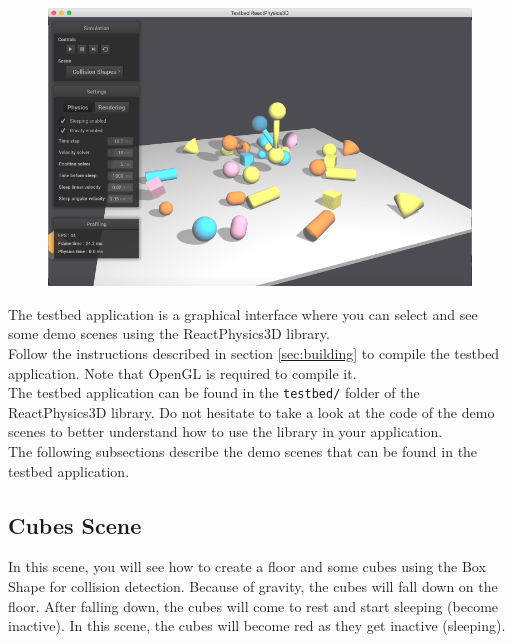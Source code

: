 \documentclass[a4paper,12pt]{article}
\begin{document}
    \begin{figure}[h]
        \centering
        \includegraphics{testbed.png}
        \label{fig:testbed}
    \end{figure}

    The testbed application is a graphical interface where you can select and see some demo scenes using the
    ReactPhysics3D library. \\

    Follow the instructions described in section \ref{sec:building} to
    compile the testbed application. Note that OpenGL is required to compile it. \\

    The testbed application can be found in the \texttt{testbed/} folder of
    the ReactPhysics3D library. Do not hesitate to take a look at the code of the demo scenes to better understand how
    to use the library in your application. \\

    The following subsections describe the demo scenes that can be found in the testbed application.

    \subsection{Cubes Scene}

    In this scene, you will see how to create a floor and some cubes using the Box Shape for collision detection. Because of gravity,
    the cubes will fall down on the floor. After falling down, the cubes will come to rest and start sleeping (become inactive). In this scene,
    the cubes will become red as they get inactive (sleeping).
\end{document}
